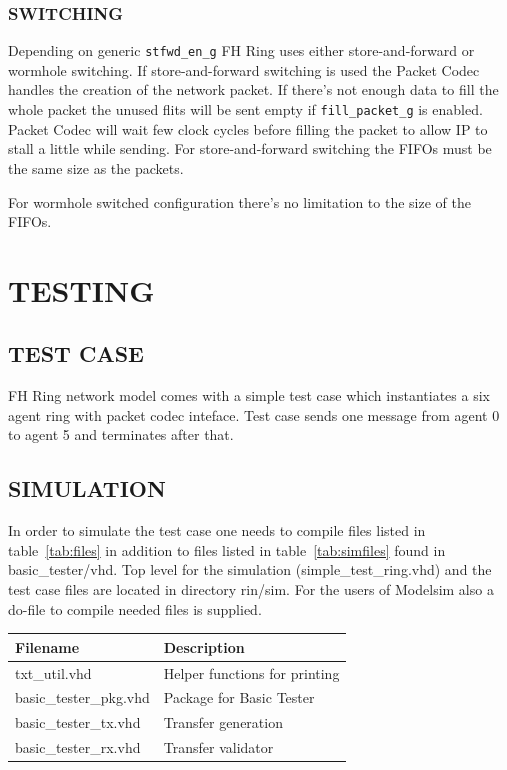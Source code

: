 \documentclass[a4paper,10pt,oneside,final]{article}
\def\deftablecolora{blue!10!white}
\def\deftablecolorb{white}
\begin{document}
\subsubsection{SWITCHING}

Depending on generic \texttt{stfwd\_en\_g} FH Ring uses either
store-and-forward or wormhole switching. If store-and-forward
switching is used the Packet Codec handles the creation of the network
packet. If there's not enough data to fill the whole packet the unused
flits will be sent empty if \texttt{fill\_packet\_g} is
enabled. Packet Codec will wait few clock cycles before filling the
packet to allow IP to stall a little while sending. For
store-and-forward switching the FIFOs must be the same size as the
packets.

\vspace{0.4cm}
\noindent
For wormhole switched configuration there's no limitation to the size
of the FIFOs.



\newpage
\section{TESTING}

\subsection{TEST CASE}

FH Ring network model comes with a simple test case which instantiates
a six agent ring with packet codec inteface. Test case sends one message
from agent 0 to agent 5 and terminates after that.

\subsection{SIMULATION}

In order to simulate the test case one needs to compile files listed
in table~\ref{tab:files} in addition to files listed in
table~\ref{tab:simfiles} found in basic\_tester/vhd. Top level for the
simulation (simple\_test\_ring.vhd) and the test case files are
located in directory rin/sim. For the users of Modelsim also a
do-file to compile needed files is supplied.


\begin{center}
  \rowcolors{3}{\deftablecolora}{\deftablecolorb}

  \label{tab:simfiles}
  \begin{tabularx}{\textwidth}{|lX|}
    \hline
    Filename   & Description\\
    \hline
    txt\_util.vhd          & Helper functions for printing\\
    basic\_tester\_pkg.vhd & Package for Basic Tester\\
    basic\_tester\_tx.vhd  & Transfer generation\\
    basic\_tester\_rx.vhd  & Transfer validator\\
    \hline
  \end{tabularx}  
\end{center}
\end{document}
